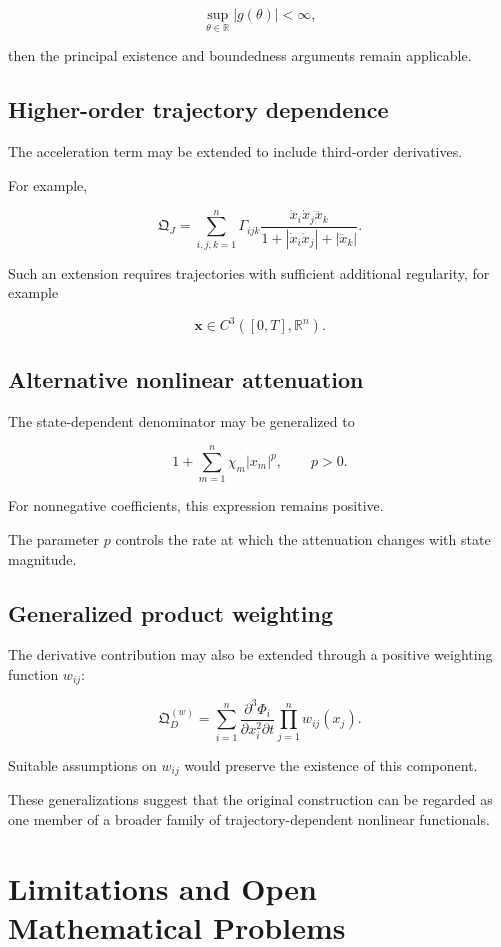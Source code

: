 \documentclass[12pt]{article}
\numberwithin{equation}{section}
\newcommand{\R}{\mathbb{R}}
\newcommand{\Q}{\mathfrak{Q}}
\theoremstyle{definition}
\theoremstyle{remark}
\begin{document}
\[
\sup_{\theta\in\R}|g(\theta)|<\infty,
\]

then the principal existence and
boundedness arguments remain applicable.

\subsection{Higher-order trajectory dependence}

The acceleration term may be extended
to include third-order derivatives.

For example,

\[
\Q_J
=
\sum_{i,j,k=1}^{n}
\Gamma_{ijk}
\frac{
\dot{x}_i\dot{x}_j\dddot{x}_k
}{
1+
|\dot{x}_i\dot{x}_j|
+
|\dddot{x}_k|
}.
\]

Such an extension requires trajectories
with sufficient additional regularity,
for example

\[
\mathbf{x}\in C^3([0,T],\R^n).
\]

\subsection{Alternative nonlinear attenuation}

The state-dependent denominator may
be generalized to

\[
1+
\sum_{m=1}^{n}
\chi_m|x_m|^p,
\qquad p>0.
\]

For nonnegative coefficients, this
expression remains positive.

The parameter \(p\) controls the rate
at which the attenuation changes with
state magnitude.

\subsection{Generalized product weighting}

The derivative contribution may also
be extended through a positive weighting
function \(w_{ij}\):

\[
\Q_D^{(w)}
=
\sum_{i=1}^{n}
\frac{\partial^3\Phi_i}
{\partial x_i^2\partial t}
\prod_{j=1}^{n}
w_{ij}(x_j).
\]

Suitable assumptions on \(w_{ij}\)
would preserve the existence of this
component.

These generalizations suggest that the
original construction can be regarded
as one member of a broader family of
trajectory-dependent nonlinear functionals.


\section{Limitations and Open Mathematical Problems}
\end{document}
